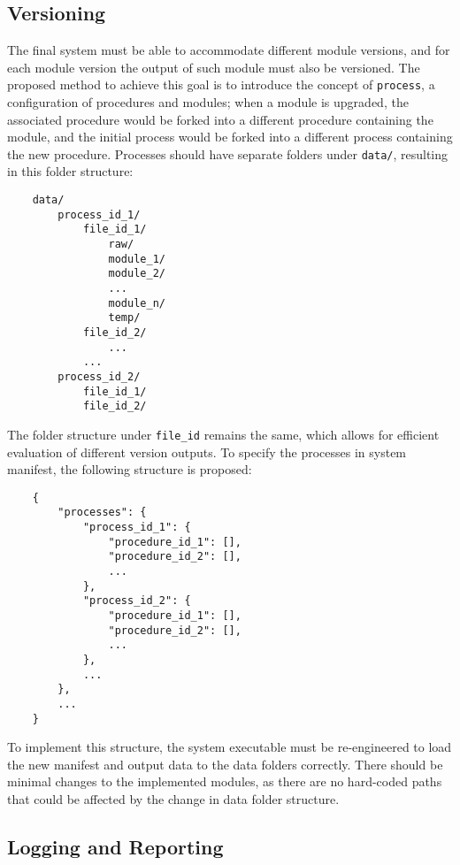 \subsection{Versioning}

The final system must be able to accommodate different module versions, and for each module version the output of such module must also be versioned. The proposed method to achieve this goal is to introduce the concept of \texttt{process}, a configuration of procedures and modules; when a module is upgraded, the associated procedure would be forked into a different procedure containing the module, and the initial process would be forked into a different process containing the new procedure. Processes should have separate folders under \texttt{data/}, resulting in this folder structure:

\begin{lstlisting}
    data/
        process_id_1/
            file_id_1/
                raw/
                module_1/
                module_2/
                ...
                module_n/
                temp/
            file_id_2/
                ...
            ...
        process_id_2/
            file_id_1/
            file_id_2/
\end{lstlisting}

The folder structure under \texttt{file\_id} remains the same, which allows for efficient evaluation of different version outputs. To specify the processes in system manifest, the following structure is proposed:

\begin{lstlisting}
    {
        "processes": {
            "process_id_1": {
                "procedure_id_1": [],
                "procedure_id_2": [],
                ...
            },
            "process_id_2": {
                "procedure_id_1": [],
                "procedure_id_2": [],
                ...
            },
            ...
        },
        ...
    }
\end{lstlisting}

To implement this structure, the system executable must be re-engineered to load the new manifest and output data to the data folders correctly. There should be minimal changes to the implemented modules, as there are no hard-coded paths that could be affected by the change in data folder structure.

\subsection{Logging and Reporting}

